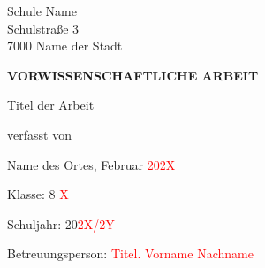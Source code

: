 \thispagestyle{empty}
\phantom{.}

\vspace{21.3mm}

\begin{center}
    Schule Name\\
    \vspace{1mm}
Schulstraße 3\\
\vspace{1mm}
7000 Name der Stadt

\vspace{21mm}

{\fontsize{20}{24}\selectfont \textbf{VORWISSENSCHAFTLICHE ARBEIT}}


\vspace{21.6mm}
Titel der Arbeit
\begin{Large}

    \textcolor{red}{{{{\fontsize{20}{24}\selectfont{Titel der VWA}}}}}

\end{Large}

\vspace{29.1mm}
verfasst von\\

\vspace{5.5mm}
\begin{Large}
\textcolor{red}{{\fontsize{20}{24}\selectfont{Vorname Nachname}}}
\end{Large}
\end{center}
\begin{small}
    

\vspace{29.3mm}
Name des Ortes, Februar \textcolor{red}{202X}

\vspace{0.75mm}
Klasse: 8 \textcolor{red}{X}

\vspace{0.73mm}
Schuljahr: 20\textcolor{red}{2X/2Y}

\vspace{0.73mm}
Betreuungsperson: \textcolor{red}{Titel. Vorname Nachname}
\end{small}